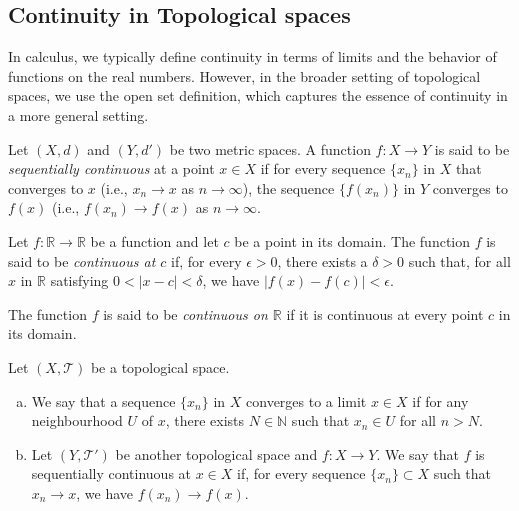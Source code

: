 \subsection{Continuity in Topological spaces}
In calculus, we typically define continuity in terms of limits and the behavior of functions on the real numbers. However, in the broader setting of topological spaces, we use the open set definition, which captures the essence of continuity in a more general setting.

\begin{definition}
    Let \( (X, d) \) and \( (Y, d') \) be two metric spaces. A function \( f: X \to Y \) is said to be \textit{sequentially continuous} at a point \( x \in X \) if for every sequence \( \{ x_n \} \) in \( X \) that converges to \( x \) (i.e., \( x_n \to x \) as \( n \to \infty \)), the sequence \( \{ f(x_n) \} \) in \( Y \) converges to \( f(x) \) (i.e., \( f(x_n) \to f(x) \) as \( n \to \infty \).
\end{definition}

\begin{definition}
    Let \( f: \mathbb{R} \to \mathbb{R} \) be a function and let \( c \) be a point in its domain. The function \( f \) is said to be \textit{continuous at \( c \)} if, for every \(\epsilon > 0\), there exists a \(\delta > 0\) such that, for all \( x \) in \(\mathbb{R}\) satisfying \( 0 < |x - c| < \delta \), we have \( |f(x) - f(c)| < \epsilon \).

    The function \( f \) is said to be \textit{continuous on \(\mathbb{R}\)} if it is continuous at every point \( c \) in its domain.
\end{definition}

\begin{definition}
    Let $(X, \mathcal{T})$ be a topological space.
    \begin{enumerate}[(a)]
        \item We say that a sequence \(\{x_n\}\) in \(X\) converges to a limit \(x \in X\) if for any neighbourhood \(U\) of \(x\), there exists \(N \in \mathbb{N}\) such that \(x_n \in U\) for all \(n > N\).
        \item Let \( (Y, \mathcal{T}') \) be another topological space and \(f: X \to Y\). We say that \(f\) is sequentially continuous at \(x \in X\) if, for every sequence \(\{ x_n \} \subset X\) such that \(x_n \to x\), we have \(f(x_n) \to f(x)\).
    \end{enumerate}
\end{definition}

